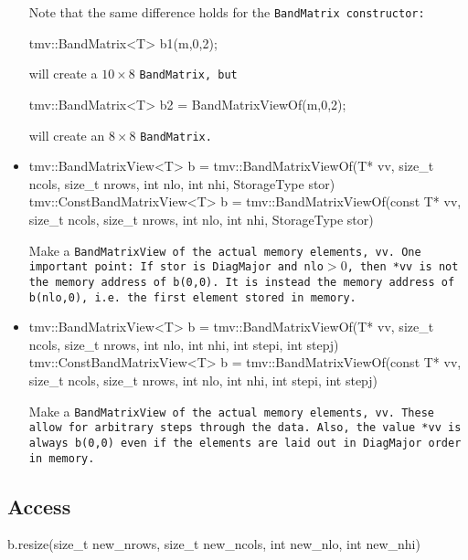 \begin{itemize}
Note that the same difference holds for the \tt{BandMatrix} constructor:
\begin{tmvcode}
tmv::BandMatrix<T> b1(m,0,2);
\end{tmvcode}
will create a $10 \times 8$ \tt{BandMatrix}, but
\begin{tmvcode}
tmv::BandMatrix<T> b2 = BandMatrixViewOf(m,0,2);
\end{tmvcode}
will create an $8 \times 8$ \tt{BandMatrix}.

\item
\begin{tmvcode}
tmv::BandMatrixView<T> b = 
      tmv::BandMatrixViewOf(T* vv, size_t ncols, size_t nrows, 
          int nlo, int nhi, StorageType stor)
tmv::ConstBandMatrixView<T> b = 
      tmv::BandMatrixViewOf(const T* vv, size_t ncols, size_t nrows, 
          int nlo, int nhi, StorageType stor)
\end{tmvcode}
Make a \tt{BandMatrixView} of the actual memory elements, \tt{vv}.
One important point: If \tt{stor} is \tt{DiagMajor} and \tt{nlo}$ > 0$, then
\tt{*vv} is not the memory address of \tt{b(0,0)}.  It is instead the memory
address of \tt{b(nlo,0)}, i.e. the first element stored in memory.

\item
\begin{tmvcode}
tmv::BandMatrixView<T> b = 
      tmv::BandMatrixViewOf(T* vv, size_t ncols, size_t nrows, 
          int nlo, int nhi, int stepi, int stepj)
tmv::ConstBandMatrixView<T> b = 
      tmv::BandMatrixViewOf(const T* vv, size_t ncols, size_t nrows, 
          int nlo, int nhi, int stepi, int stepj)
\end{tmvcode}
Make a \tt{BandMatrixView} of the actual memory elements, \tt{vv}.
These allow for arbitrary steps through the data.  Also, the value \tt{*vv}
is always \tt{b(0,0)} even if the elements are laid out in DiagMajor order in memory.


\end{itemize}

\subsection{Access}
\label{BandMatrix_Access}

\begin{tmvcode}
b.resize(size_t new_nrows, size_t new_ncols, int new_nlo, int new_nhi)
\end{tmvcode}

